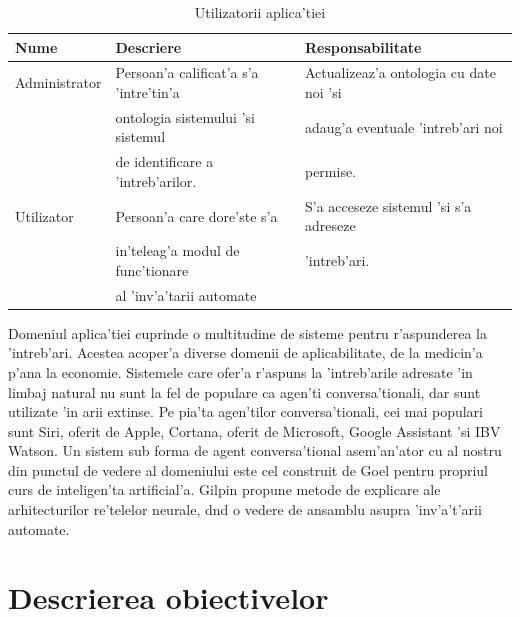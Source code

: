 \documentclass[12pt,a4paper,twoside]{report}
\begin{document}
\begin{table}
    \centering
    \begin{tabular}{l|l|l}
    Nume & Descriere & Responsabilitate \\
    \hline
Administrator & Persoan'a calificat'a s'a 'intre'tin'a & Actualizeaz'a ontologia cu date noi 'si \\
 &  ontologia sistemului 'si sistemul & adaug'a eventuale 'intreb'ari noi \\
 & de identificare a 'intreb'arilor. & permise. \\
    \hline
Utilizator & Persoan'a care dore'ste s'a & S'a acceseze sistemul 'si s'a adreseze \\
& in'teleag'a modul de func'tionare & 'intreb'ari.\\
&  al 'inv'a'tarii automate & \\
    \end{tabular}
     \caption{Utilizatorii aplica'tiei}
    \label{tab:stakeholders}
\end{table}

Domeniul aplica'tiei cuprinde o multitudine de sisteme pentru r'aspunderea la 'intreb'ari. Acestea acoper'a diverse domenii de aplicabilitate, de la medicin'a p'ana la economie. Sistemele care ofer'a r'aspuns la 'intreb'arile adresate 'in limbaj natural nu sunt la fel de populare ca agen'ti conversa'tionali, dar sunt utilizate 'in arii extinse. Pe pia'ta agen'tilor conversa'tionali, cei mai populari sunt Siri, oferit de Apple, Cortana, oferit de Microsoft, Google Assistant 'si IBV Watson. Un sistem sub forma de agent conversa'tional asem'an'ator cu al nostru din punctul de vedere al domeniului este cel construit de Goel \cite{WatsonAEducation} pentru propriul curs de inteligen'ta artificial'a. Gilpin \cite{Gilpin2019ExplainingLearning} propune metode de explicare ale arhitecturilor re'telelor neurale, d\ia nd o vedere de ansamblu asupra 'inv'a't'arii automate.

\section{Descrierea obiectivelor}
\end{document}
